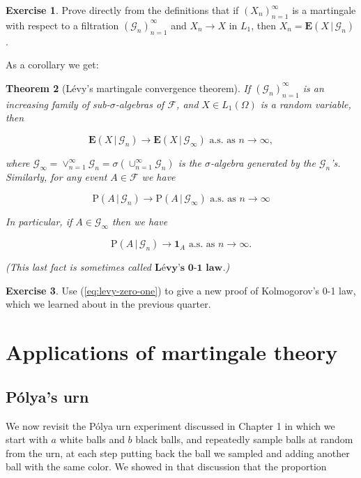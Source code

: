 \documentclass[11pt]{report}
\theoremstyle{plain}
\newtheorem{thm}{Theorem}[chapter]
\theoremstyle{definition}
\newtheorem{xexercise}[thm]{Exercise}
\begin{document}
\begin{xexercise}
Prove directly from the definitions that if $(X_n)_{n=1}^\infty$ is a martingale with respect to a filtration $(\mathcal{G}_n)_{n=1}^\infty$ and $X_n\to X$ in $L_1$, then $X_n = \mathbf{E}\left(X\,|\,\mathcal{G}_n\right)$.
\end{xexercise}

As a corollary we get:

\begin{thm}[Lévy's martingale convergence theorem]
\label{eq:levy-martingale-conv}
If $(\mathcal{G}_n)_{n=1}^\infty$ is an increasing family of sub-$\sigma$-algebras of $\mathcal{F}$, and $X\in L_1(\Omega)$ is a random variable, then

\[
\mathbf{E}\left(X\,|\,\mathcal{G}_n\right) \to \mathbf{E}\left(X\,|\,\mathcal{G}_\infty\right) \textrm{ a.s. as }n\to\infty,
\]

where $\mathcal{G}_\infty = \vee_{n=1}^\infty \mathcal{G}_n = \sigma\left(\cup_{n=1}^\infty \mathcal{G}_n\right)$ is the $\sigma$-algebra generated by the $\mathcal{G}_n$'s. Similarly, for any event $A\in \mathcal{F}$ we have

\[
\mathrm{P}\left(A\,|\,\mathcal{G}_n\right) \to \mathrm{P}\left(A\,|\,\mathcal{G}_\infty\right) \textrm{ a.s. as }n\to\infty
\]

In particular, if $A \in \mathcal{G}_\infty$ then we have

\begin{equation*} \tag{8}\label{eq:levy-zero-one}
\mathrm{P}\left(A\,|\,\mathcal{G}_n\right) \to \mathbf{1}_A \textrm{ a.s. as }n\to\infty.
\end{equation*}

(This last fact is sometimes called $\textbf{Lévy's 0-1 law}$.)
\end{thm}

\begin{xexercise}
Use (\ref{eq:levy-zero-one}) to give a new proof of Kolmogorov's 0-1 law, which we learned about in the previous quarter.
\end{xexercise}

\chapter{Applications of martingale theory}

\section{Pólya's urn}
We now revisit the P\'olya urn experiment discussed in Chapter 1 in which we start with $a$ white balls and $b$ black balls, and repeatedly sample balls at random from the urn, at each step putting back the ball we sampled and adding another ball with the same color. We showed in that discussion that the proportion
\end{document}
